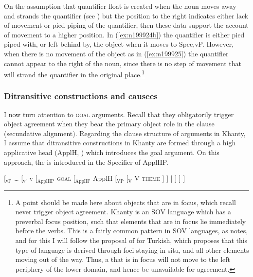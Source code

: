 \documentclass[output=paper
,modfonts
,nonflat]{langsci/langscibook}
\begin{document}
\noindent On the assumption that quantifier float is created when the noun moves away and strands the quantifier (see \citealt{sportiche1988,mccloskey2000,boskovic2004b}) but the position to the right indicates either lack of movement or pied piping of the quantifier, then these data support the account of movement to a higher position.
In (\ref{ex:n199924b}) the quantifier is either pied piped with, or left behind by, the object when it moves to Spec,vP. However, when there is no movement of the object as in (\ref{ex:n199925}) the quantifier cannot appear to the right of the noun, since there is no step of movement that will strand the quantifier in the original place.\footnote{A point should be made here about \theme{} objects that are in focus, which recall never trigger object agreement.  Khanty is an SOV language which has a preverbal focus position, such that elements that are in focus lie immediately before the verbs.
This is a fairly common pattern in SOV languages, as \citet{nikolaeva1999} notes, and for this I will follow the proposal of \citet{sener2010} for Turkish, which \citeauthor{sener2010} proposes that this type of language is derived through foci staying in-situ, and all other elements moving out of the way.
Thus, a \theme{} that is in focus will not move to the left periphery of the lower domain, and hence be unavailable for agreement.}

\subsubsection{Ditransitive constructions and causees}\largerpage[2]

I now turn attention to \textsc{goal} arguments. Recall that they obligatorily trigger object agreement when they bear the primary object role in the clause (secundative alignment).
Regarding the clause structure of \goal{} arguments in Khanty, I assume that ditransitive constructions in Khanty are formed through a high applicative head (ApplH, \citealt{pylkkanen2008}) which introduces the goal argument.
On this approach, the \goal{} is introduced in the Specifier of ApplHP.


\begin{exe}
\ex \label{tree:highappl}
 { [$_{\textrm{vP}}$ {\ldots} [$_{\textrm{v'}}$ v [$_{\textrm{ApplHP}}$ \textsc{goal} [$_{\textrm{ApplH'}}$ ApplH [$_{\textrm{VP}}$ {} [$_{\textrm{V}}$ V \textsc{theme}  ] ] ] ] ] ]}

\end{exe}
\end{document}
